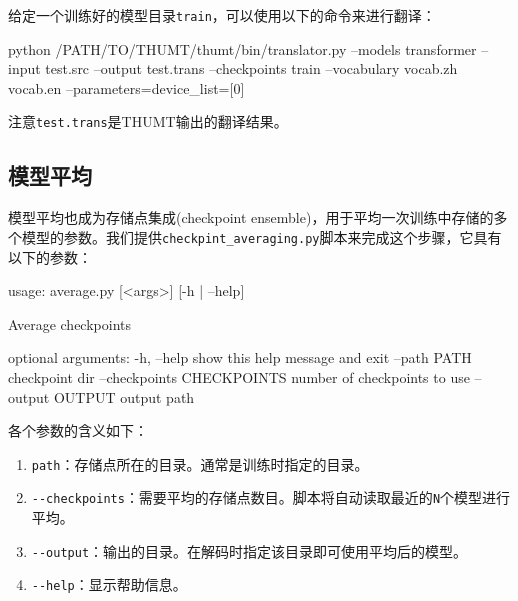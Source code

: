 \documentclass{article}
\begin{document}
给定一个训练好的模型目录\verb|train|，可以使用以下的命令来进行翻译：

\begin{everbatim}
python /PATH/TO/THUMT/thumt/bin/translator.py
  --models transformer
  --input test.src
  --output test.trans
  --checkpoints train
  --vocabulary vocab.zh vocab.en
  --parameters=device_list=[0]
\end{everbatim}
注意\verb|test.trans|是THUMT输出的翻译结果。


\subsection{模型平均}
模型平均也成为存储点集成(checkpoint ensemble)，用于平均一次训练中存储的多个模型的参数。我们提供\verb|checkpint_averaging.py|脚本来完成这个步骤，它具有以下的参数：
\begin{everbatim}
usage: average.py [<args>] [-h | --help]

Average checkpoints

optional arguments:
  -h, --help            show this help message and exit
  --path PATH           checkpoint dir
  --checkpoints CHECKPOINTS
                        number of checkpoints to use
  --output OUTPUT       output path
\end{everbatim}

各个参数的含义如下：
\begin{enumerate}
\item \verb|path|：存储点所在的目录。通常是训练时指定的目录。
\item \verb|--checkpoints|：需要平均的存储点数目。脚本将自动读取最近的\verb|N|个模型进行平均。
\item \verb|--output|：输出的目录。在解码时指定该目录即可使用平均后的模型。
\item \verb|--help|：显示帮助信息。
\end{enumerate}
\end{document}
